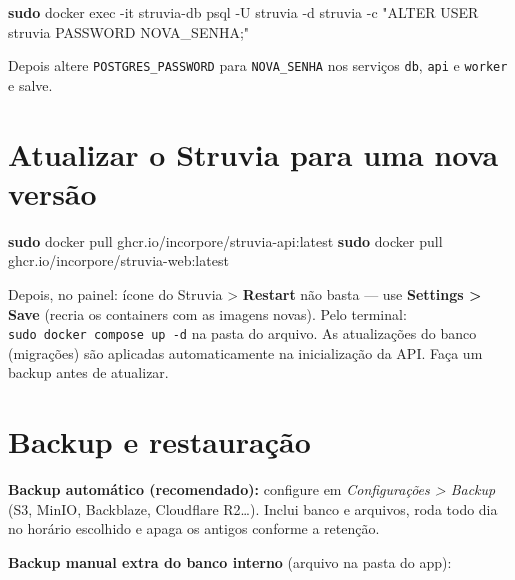 \documentclass[
  10pt,
]{article}
\newenvironment{Shaded}{\begin{snugshade}}{\end{snugshade}}
\newcommand{\AttributeTok}[1]{\textcolor[rgb]{0.13,0.29,0.53}{#1}}
\newcommand{\FunctionTok}[1]{\textcolor[rgb]{0.13,0.29,0.53}{\textbf{#1}}}
\newcommand{\NormalTok}[1]{#1}
\newcommand{\StringTok}[1]{\textcolor[rgb]{0.31,0.60,0.02}{#1}}
\begin{document}
\begin{Shaded}
\begin{Highlighting}[]
\FunctionTok{sudo}\NormalTok{ docker exec }\AttributeTok{{-}it}\NormalTok{ struvia{-}db psql }\AttributeTok{{-}U}\NormalTok{ struvia }\AttributeTok{{-}d}\NormalTok{ struvia }\AttributeTok{{-}c} \StringTok{"ALTER USER struvia PASSWORD \textquotesingle{}NOVA\_SENHA\textquotesingle{};"}
\end{Highlighting}
\end{Shaded}

Depois altere \texttt{POSTGRES\_PASSWORD} para \texttt{NOVA\_SENHA} nos
serviços \texttt{db}, \texttt{api} e \texttt{worker} e salve.

\hypertarget{atualizar-o-struvia-para-uma-nova-versuxe3o}{%
\section{Atualizar o Struvia para uma nova
versão}\label{atualizar-o-struvia-para-uma-nova-versuxe3o}}

\begin{Shaded}
\begin{Highlighting}[]
\FunctionTok{sudo}\NormalTok{ docker pull ghcr.io/incorpore/struvia{-}api:latest}
\FunctionTok{sudo}\NormalTok{ docker pull ghcr.io/incorpore/struvia{-}web:latest}
\end{Highlighting}
\end{Shaded}

Depois, no painel: ícone do Struvia \textgreater{} \textbf{Restart} não
basta --- use \textbf{Settings \textgreater{} Save} (recria os
containers com as imagens novas). Pelo terminal:
\texttt{sudo\ docker\ compose\ up\ -d} na pasta do arquivo. As
atualizações do banco (migrações) são aplicadas automaticamente na
inicialização da API. Faça um backup antes de atualizar.

\hypertarget{backup-e-restaurauxe7uxe3o}{%
\section{Backup e restauração}\label{backup-e-restaurauxe7uxe3o}}

\textbf{Backup automático (recomendado):} configure em
\emph{Configurações \textgreater{} Backup} (S3, MinIO, Backblaze,
Cloudflare R2\ldots). Inclui banco e arquivos, roda todo dia no horário
escolhido e apaga os antigos conforme a retenção.

\textbf{Backup manual extra do banco interno} (arquivo na pasta do app):
\end{document}

